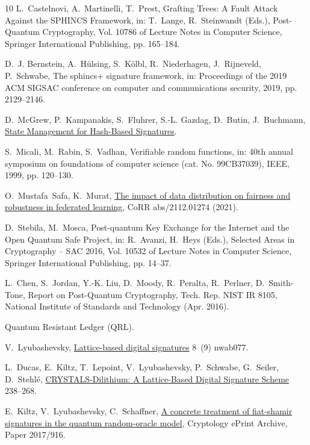 \documentclass[lettersize,journal]{IEEEtran}
\begin{document}
\begin{thebibliography}{10}
L.~Castelnovi, A.~Martinelli, T.~Prest, Grafting {{Trees}}: {{A Fault Attack
  Against}} the {{SPHINCS Framework}}, in: T.~Lange, R.~Steinwandt (Eds.),
  Post-{{Quantum Cryptography}}, Vol. 10786 of Lecture {{Notes}} in {{Computer
  Science}}, {Springer International Publishing}, pp. 165--184.

D.~J. Bernstein, A.~H{\"u}lsing, S.~K{\"o}lbl, R.~Niederhagen, J.~Rijneveld,
  P.~Schwabe, The sphincs+ signature framework, in: Proceedings of the 2019 ACM
  SIGSAC conference on computer and communications security, 2019, pp.
  2129--2146.

D.~McGrew, P.~Kampanakis, S.~Fluhrer, S.-L. Gazdag, D.~Butin, J.~Buchmann,
  \href{http://eprint.iacr.org/2016/357}{State {{Management}} for {{Hash-Based
  Signatures}}}.

S.~Micali, M.~Rabin, S.~Vadhan, Verifiable random functions, in: 40th annual
  symposium on foundations of computer science (cat. No. 99CB37039), IEEE,
  1999, pp. 120--130.

O.~Mustafa~Safa, K.~Murat, \href{https://arxiv.org/abs/2112.01274}{The impact
  of data distribution on fairness and robustness in federated learning}, CoRR
  abs/2112.01274 (2021).

D.~Stebila, M.~Mosca, Post-quantum {{Key Exchange}} for the {{Internet}} and
  the {{Open Quantum Safe Project}}, in: R.~Avanzi, H.~Heys (Eds.), Selected
  {{Areas}} in {{Cryptography}} – {{SAC}} 2016, Vol. 10532 of Lecture
  {{Notes}} in {{Computer Science}}, {Springer International Publishing}, pp.
  14--37.


L.~Chen, S.~Jordan, Y.-K. Liu, D.~Moody, R.~Peralta, R.~Perlner, D.~Smith-Tone,
  Report on {Post}-{Quantum} {Cryptography}, Tech. Rep. NIST IR 8105, National
  Institute of Standards and Technology (Apr. 2016).

Quantum {{Resistant Ledger}} ({{QRL}}).

V.~Lyubashevsky,
  \href{https://academic.oup.com/nsr/article/doi/10.1093/nsr/nwab077/6272426}{Lattice-based
  digital signatures} 8~(9)  nwab077.


L.~Ducas, E.~Kiltz, T.~Lepoint, V.~Lyubashevsky, P.~Schwabe, G.~Seiler,
  D.~Stehlé,
  \href{https://tches.iacr.org/index.php/TCHES/article/view/839}{{{CRYSTALS-Dilithium}}:
  {{A Lattice-Based Digital Signature Scheme}}}  238--268.


E.~Kiltz, V.~Lyubashevsky, C.~Schaffner,
  \href{https://eprint.iacr.org/2017/916}{A concrete treatment of fiat-shamir
  signatures in the quantum random-oracle model}, Cryptology ePrint Archive,
  Paper 2017/916.

\end{thebibliography}
\end{document}
